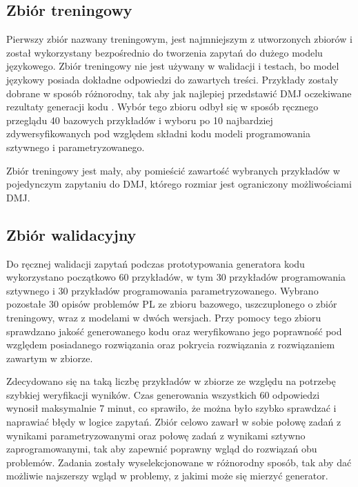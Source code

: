 \subsection{Zbiór treningowy}

Pierwszy zbiór nazwany treningowym, jest najmniejszym z utworzonych zbiorów i został wykorzystany bezpośrednio do tworzenia zapytań do dużego modelu językowego. Zbiór treningowy nie jest używany w walidacji i testach, bo model językowy posiada dokładne odpowiedzi do zawartych treści. Przykłady zostały dobrane w sposób różnorodny, tak aby jak najlepiej przedstawić DMJ oczekiwane rezultaty generacji kodu . Wybór tego zbioru odbył się w sposób ręcznego przeglądu 40 bazowych przykładów i wyboru po 10 najbardziej zdywersyfikowanych pod względem składni kodu  modeli programowania sztywnego i parametryzowanego.  %

Zbiór treningowy jest mały, aby pomieścić zawartość wybranych przykładów w pojedynczym zapytaniu do DMJ, którego rozmiar jest ograniczony możliwościami DMJ.

\subsection{Zbiór walidacyjny}

Do ręcznej walidacji zapytań podczas prototypowania generatora kodu   wykorzystano początkowo 60 przykładów, w tym 30 przykładów programowania sztywnego i 30 przykładów programowania parametryzowanego. Wybrano pozostałe 30 opisów problemów PL ze zbioru bazowego, uszczuplonego o zbiór treningowy, wraz z modelami  w dwóch wersjach. Przy pomocy tego zbioru sprawdzano jakość generowanego kodu   oraz weryfikowano jego poprawność pod względem posiadanego rozwiązania oraz pokrycia rozwiązania z rozwiązaniem zawartym w zbiorze.

Zdecydowano się na taką liczbę przykładów w zbiorze ze względu na potrzebę szybkiej weryfikacji wyników. Czas generowania wszystkich 60 odpowiedzi wynosił maksymalnie 7 minut, co sprawiło, że można było szybko sprawdzać i naprawiać błędy w logice zapytań. Zbiór celowo zawarł w sobie połowę zadań z wynikami parametryzowanymi oraz połowę zadań z wynikami sztywno zaprogramowanymi, tak aby zapewnić poprawny wgląd do rozwiązań obu problemów. Zadania zostały wyselekcjonowane w różnorodny sposób, tak aby dać możliwie najszerszy wgląd w problemy, z jakimi może się mierzyć generator. %


